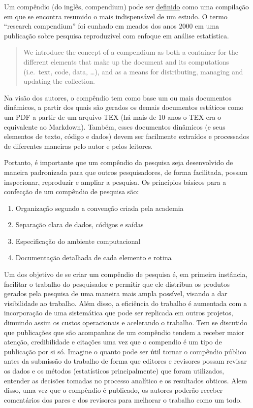 \documentclass[]{book}
\providecommand{\tightlist}{%
  \setlength{\itemsep}{0pt}\setlength{\parskip}{0pt}}
\begin{document}
Um compêndio (do inglês, compendium) pode ser
\href{https://www.priberam.pt/dlpo/compêndio}{definido} como uma
compilação em que se encontra resumido o mais indispensável de um
estudo. O termo ``research compendium'' foi cunhado em meados dos anos
2000 em uma publicação sobre pesquisa reproduzível com enfoque em
análise estatística.

\begin{quote}
We introduce the concept of a compendium as both a container for the
different elements that make up the document and its computations
(i.e.~text, code, data, \ldots{}), and as a means for distributing,
managing and updating the
collection.\citep{Robert_Gentleman_Department_of_Biostatistics_Harvard_University2004-qt}
\end{quote}

Na visão dos autores, o compêndio tem como base um ou mais documentos
dinâmicos, a partir dos quais são gerados os demais documentos estáticos
como um PDF a partir de um arquivo TEX (há mais de 10 anos o TEX era o
equivalente ao Markdown). Também, esses documentos dinâmicos (e seus
elementos de texto, código e dados) devem ser facilmente extraídos e
processados de diferentes maneiras pelo autor e pelos leitores.

Portanto, é importante que um compêndio da pesquisa seja desenvolvido de
maneira padronizada para que outros pesquisadores, de forma facilitada,
possam inspecionar, reproduzir e ampliar a pesquisa. Os princípios
básicos para a confecção de um compêndio de pesquisa são:

\begin{enumerate}
\def\labelenumi{\arabic{enumi})}
\tightlist
\item
  Organização segundo a convenção criada pela academia
\item
  Separação clara de dados, códigos e saídas
\item
  Especificação do ambiente computacional
\item
  Documentação detalhada de cada elemento e rotina
\end{enumerate}

Um dos objetivo de se criar um compêndio de pesquisa é, em primeira
instância, facilitar o trabalho do pesquisador e permitir que ele
distribua os produtos gerados pela pesquisa de uma maneira mais ampla
possível, visando a dar visibilidade ao trabalho. Além disso, a
eficiência do trabalho é aumentada com a incorporação de uma sistemática
que pode ser replicada em outros projetos, dimuindo assim os custos
operacionais e acelerando o trabalho. Tem se discutido que publicações
que são acompanhas de um compêndio tendem a receber maior atenção,
credibilidade e citações uma vez que o compendio é um tipo de publicação
por si só. Imagine o quanto pode ser útil tornar o compêndio público
antes da submissão do trabalho de forma que editores e revisores possam
revisar os dados e os métodos (estatísticos principalmente) que foram
utilizados, entender as decisões tomadas no processo analítico e os
resultados obticos. Alem disso, uma vez que o compêndio é publicado, os
autores poderão receber comentários dos pares e dos revisores para
melhorar o trabalho como um todo.
\end{document}
